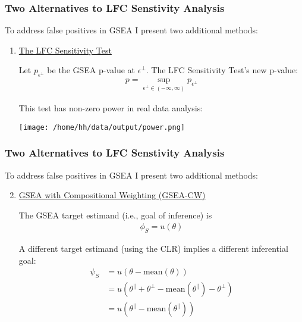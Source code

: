 \documentclass[11pt]{beamer}
\begin{document}
\begin{frame}
  \frametitle{Two Alternatives to LFC Senstivity Analysis}

  To address false positives in GSEA I present two additional methods:
  \pause
  \begin{enumerate}
  \item \underline{The LFC Sensitivity Test}

    \vspace{5px}
    Let \(p_{\epsilon^\perp}\) be the GSEA p-value at \(\epsilon^\perp\). The LFC Sensitivity Test's new p-value:
    \begin{align*}
      p=\sup_{\epsilon^\perp \in (-\infty, \infty)} p_{\epsilon^\perp}
    \end{align*}

    This test has non-zero power in real data analysis:
    \begin{center}
      \texttt{[image: /home/hh/data/output/power.png]}
    \end{center}


  \end{enumerate}  
\end{frame}

\begin{frame}
  \frametitle{Two Alternatives to LFC Senstivity Analysis}
  To address false positives in GSEA I present two additional methods:
  \begin{enumerate}
   \setcounter{enumi}{1}
   \item \underline{GSEA with Compositional Weighting (GSEA-CW)}

    \vspace{5px}
    The GSEA target estimand (i.e., goal of inference) is
    \begin{align*}
      \phi_S = u(\theta)
    \end{align*}

    A different target estimand (using the CLR) implies a different inferential goal:
    \begin{align*}
      \psi_S &= u(\theta-\text{mean}(\theta)) \\
      &= u(\theta^\parallel+\theta^\perp-\text{mean}(\theta^\parallel)-\theta^\perp) \\
      &= u(\theta^\parallel-\text{mean}(\theta^\parallel))
    \end{align*}
    
  \end{enumerate}
\end{frame}
  
\end{document}

